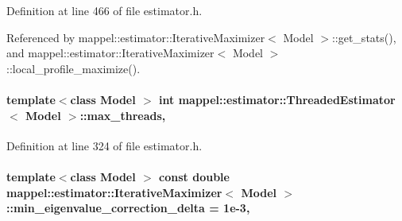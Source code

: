Definition at line 466 of file estimator.\+h.



Referenced by mappel\+::estimator\+::\+Iterative\+Maximizer$<$ Model $>$\+::get\+\_\+stats(), and mappel\+::estimator\+::\+Iterative\+Maximizer$<$ Model $>$\+::local\+\_\+profile\+\_\+maximize().

\paragraph[{\texorpdfstring{max\+\_\+threads}{max_threads}}]{\setlength{\rightskip}{0pt plus 5cm}template$<$class Model $>$ int {\bf mappel\+::estimator\+::\+Threaded\+Estimator}$<$ Model $>$\+::max\+\_\+threads\hspace{0.3cm}{\ttfamily [protected]}, {\ttfamily [inherited]}}\hypertarget{classmappel_1_1estimator_1_1ThreadedEstimator_ab4c55ecff71dff47c0584ce20fe7f077}{}\label{classmappel_1_1estimator_1_1ThreadedEstimator_ab4c55ecff71dff47c0584ce20fe7f077}


Definition at line 324 of file estimator.\+h.

\paragraph[{\texorpdfstring{min\+\_\+eigenvalue\+\_\+correction\+\_\+delta}{min_eigenvalue_correction_delta}}]{\setlength{\rightskip}{0pt plus 5cm}template$<$class Model $>$ const double {\bf mappel\+::estimator\+::\+Iterative\+Maximizer}$<$ Model $>$\+::min\+\_\+eigenvalue\+\_\+correction\+\_\+delta = 1e-\/3\hspace{0.3cm}{\ttfamily [static]}, {\ttfamily [protected]}}\hypertarget{classmappel_1_1estimator_1_1IterativeMaximizer_a9c23c94f649688d01e9eb938a692c6f5}{}\label{classmappel_1_1estimator_1_1IterativeMaximizer_a9c23c94f649688d01e9eb938a692c6f5}


